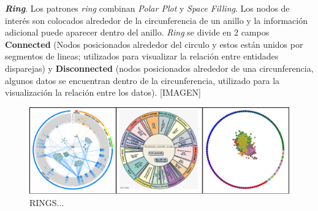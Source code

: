 \textbf{\textit{Ring}}. Los patrones \textit{ring} combinan \textit{Polar Plot} y \textit{Space Filling}. Los nodos de interés son colocados alrededor de la circunferencia de un anillo y la información adicional puede aparecer dentro del anillo. \textit{Ring} se divide en 2 campos \textbf{Connected} (Nodos posicionados alrededor del circulo y estos están unidos por segmentos de lineas; utilizados para visualizar la relación entre entidades disparejas) y \textbf{Disconnected} (nodos posicionados alrededor de una circunferencia, algunos datos se encuentran dentro de la circunferencia, utilizado para la visualización la relación entre los datos).
\textcolor[rgb]{0.2,0.8,0.2}{[IMAGEN]}
\begin{figure}[!h]
\centering
\includegraphics[width=0.8\columnwidth]{figs/Ring}%
\caption{RINGS...}%
\label{fig:Ring}%
\end{figure}

